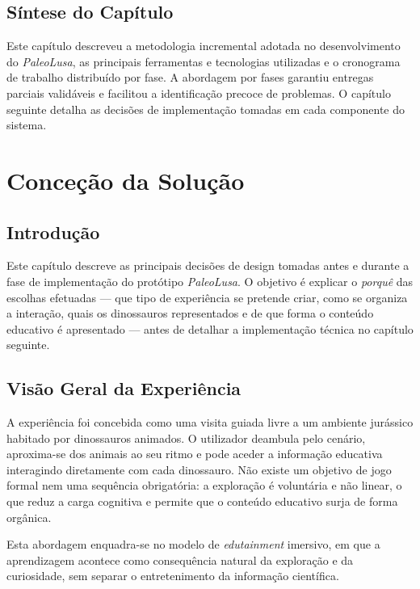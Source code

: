 \documentclass[a4paper,11pt]{report}
\newcommand{\blankpage}{%
    \newpage
    \thispagestyle{empty}
    \mbox{}
    \newpage
}
\begin{document}
\section{Síntese do Capítulo}

Este capítulo descreveu a metodologia incremental adotada no desenvolvimento
do \textit{PaleoLusa}, as principais ferramentas e tecnologias utilizadas e
o cronograma de trabalho distribuído por fase. A abordagem por fases garantiu
entregas parciais validáveis e facilitou a identificação precoce de problemas.
O capítulo seguinte detalha as decisões de implementação tomadas em cada
componente do sistema.

\blankpage

\chapter{Conceção da Solução}

\section{Introdução}

Este capítulo descreve as principais decisões de design tomadas antes e durante
a fase de implementação do protótipo \textit{PaleoLusa}. O objetivo é explicar
o \textit{porquê} das escolhas efetuadas --- que tipo de experiência se pretende
criar, como se organiza a interação, quais os dinossauros representados e de que
forma o conteúdo educativo é apresentado --- antes de detalhar a implementação
técnica no capítulo seguinte.

\section{Visão Geral da Experiência}

A experiência foi concebida como uma visita guiada livre a um ambiente jurássico
habitado por dinossauros animados. O utilizador deambula pelo cenário, aproxima-se
dos animais ao seu ritmo e pode aceder a informação educativa interagindo
diretamente com cada dinossauro. Não existe um objetivo de jogo formal nem uma
sequência obrigatória: a exploração é voluntária e não linear, o que reduz a
carga cognitiva e permite que o conteúdo educativo surja de forma orgânica.

Esta abordagem enquadra-se no modelo de \textit{edutainment} imersivo, em que
a aprendizagem acontece como consequência natural da exploração e da curiosidade,
sem separar o entretenimento da informação científica.
\end{document}
